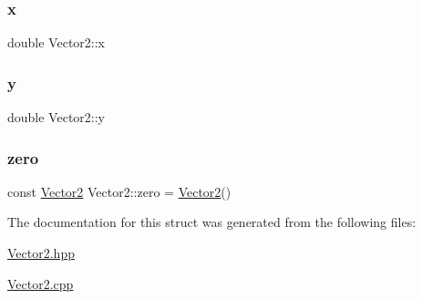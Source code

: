 \mbox{\label{struct_vector2_a61d73d9036ccbb3257fbe595c014a1d0}} 
\subsubsection{\texorpdfstring{x}{x}}
{\footnotesize\ttfamily double Vector2\+::x}

\mbox{\label{struct_vector2_a4df9b2a8e79e6e30a7a3b34722d8b8b8}} 
\subsubsection{\texorpdfstring{y}{y}}
{\footnotesize\ttfamily double Vector2\+::y}

\mbox{\label{struct_vector2_a28849e17f54c1c995f035544b5fd0a5f}} 
\subsubsection{\texorpdfstring{zero}{zero}}
{\footnotesize\ttfamily const \mbox{\hyperlink{struct_vector2}{Vector2}} Vector2\+::zero = \mbox{\hyperlink{struct_vector2}{Vector2}}()\hspace{0.3cm}{\ttfamily [static]}}



The documentation for this struct was generated from the following files\+:\begin{DoxyCompactItemize}
\item 
\mbox{\hyperlink{_vector2_8hpp}{Vector2.\+hpp}}\item 
\mbox{\hyperlink{_vector2_8cpp}{Vector2.\+cpp}}\end{DoxyCompactItemize}

